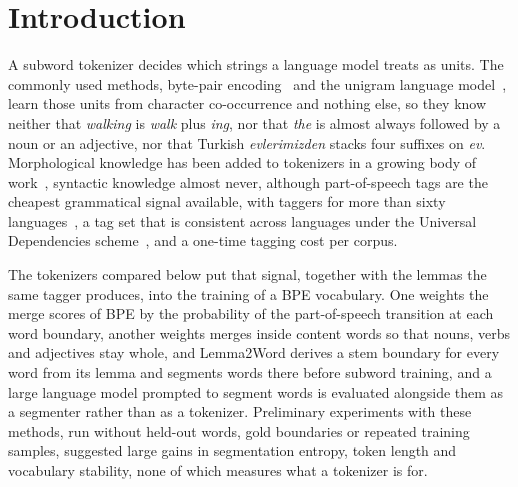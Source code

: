 \section{Introduction}\label{sec:intro}

A subword tokenizer decides which strings a language model treats as units.
The commonly used methods, byte-pair encoding~\cite{sennrich2016bpe} and the unigram language model~\cite{kudo2018subword}, learn those units from character co-occurrence and nothing else, so they know neither that \emph{walking} is \emph{walk} plus \emph{ing}, nor that \emph{the} is almost always followed by a noun or an adjective, nor that Turkish \emph{evlerimizden} stacks four suffixes on \emph{ev}.
Morphological knowledge has been added to tokenizers in a growing body of work~\cite{jabbar2023morphpiece,asgari2025morphbpe,hofmann2021superbizarre}, syntactic knowledge almost never, although part-of-speech tags are the cheapest grammatical signal available, with taggers for more than sixty languages~\cite{qi2020stanza}, a tag set that is consistent across languages under the Universal Dependencies scheme~\cite{nivre2020ud}, and a one-time tagging cost per corpus.

The tokenizers compared below put that signal, together with the lemmas the same tagger produces, into the training of a BPE vocabulary.
One weights the merge scores of BPE by the probability of the part-of-speech transition at each word boundary, another weights merges inside content words so that nouns, verbs and adjectives stay whole, and Lemma2Word derives a stem boundary for every word from its lemma and segments words there before subword training, and a large language model prompted to segment words is evaluated alongside them as a segmenter rather than as a tokenizer.
Preliminary experiments with these methods, run without held-out words, gold boundaries or repeated training samples, suggested large gains in segmentation entropy, token length and vocabulary stability, none of which measures what a tokenizer is for.


